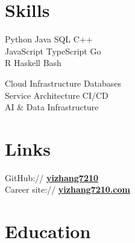 \documentclass[letterpaper]{deedy-resume} %
\begin{document}
\begin{minipage}[t]{0.36\textwidth} %
\renewcommand{\sectionspace}{\vspace{8.45pt}} %


\section{Skills}

\descript{}
\vspace{0.4em}
\textbullet{} Python \textbullet{} Java \textbullet{} SQL \textbullet{} C++ \\
\textbullet{} JavaScript \textbullet{} TypeScript \textbullet{} Go \\
\textbullet{} R \textbullet{} Haskell \textbullet{} Bash\\
\sectionspace %

\descript{}
\vspace{0.4em}
\textbullet{} Cloud Infrastructure \textbullet{} Databases \\
\textbullet{} Service Architecture \textbullet{} CI/CD \\
\textbullet{} AI \& Data Infrastructure\\

\sectionspace %


\section{Links} 
GitHub:// \href{https://github.com/yizhang7210}{\bf yizhang7210} \\
Career site:// \href{https://yizhang7210.com}{\bf yizhang7210.com} \\

\sectionspace %


\section{Education} 


\end{minipage}
\end{document}
